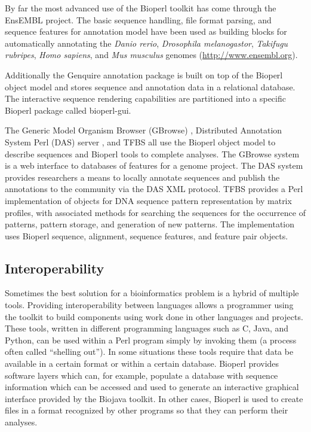 \documentclass[12pt]{article}
\begin{document}
By far the most advanced use of the Bioperl toolkit has come through
the EnsEMBL \cite{ensembl-nar} project.  The basic sequence handling,
file format parsing, and sequence features for annotation model have
been used as building blocks for automatically annotating the
\textit{Danio rerio}, \textit{Drosophila melanogastor},
\textit{Takifugu rubripes}, \textit{Homo sapiens}, and \textit{Mus
musculus} genomes (\url{http://www.ensembl.org}).

Additionally the Genquire \cite{genquire} annotation package is built
on top of the Bioperl object model and stores sequence and annotation
data in a relational database.  The interactive sequence rendering
capabilities are partitioned into a specific Bioperl package called
bioperl-gui.

The Generic Model Organism Browser (GBrowse) \cite{gmod}, Distributed
Annotation System Perl (DAS) server \cite{das}, and TFBS \cite{tfbs}
all use the Bioperl object model to describe sequences and Bioperl
tools to complete analyses.  The GBrowse system is a web interface to
databases of features for a genome project.  The DAS system provides
researchers a means to locally annotate sequences and publish the
annotations to the community via the DAS XML protocol.  TFBS provides
a Perl implementation of objects for DNA sequence pattern
representation by matrix profiles, with associated methods for
searching the sequences for the occurrence of patterns, pattern
storage, and generation of new patterns. The implementation uses
Bioperl sequence, alignment, sequence features, and feature pair
objects.

\subsection{Interoperability}

Sometimes the best solution for a bioinformatics problem is a hybrid
of multiple tools.  Providing interoperability between languages
allows a programmer using the toolkit to build components using work
done in other languages and projects.  These tools, written in
different programming languages such as C, Java, and Python, can be
used within a Perl program simply by invoking them (a process often
called ``shelling out'').  In some situations these tools require that
data be available in a certain format or within a certain database.
Bioperl provides software layers which can, for example, populate a
database with sequence information which can be accessed and used to
generate an interactive graphical interface provided by the Biojava
toolkit.  In other cases, Bioperl is used to create files in a format
recognized by other programs so that they can perform their analyses.
\end{document}
